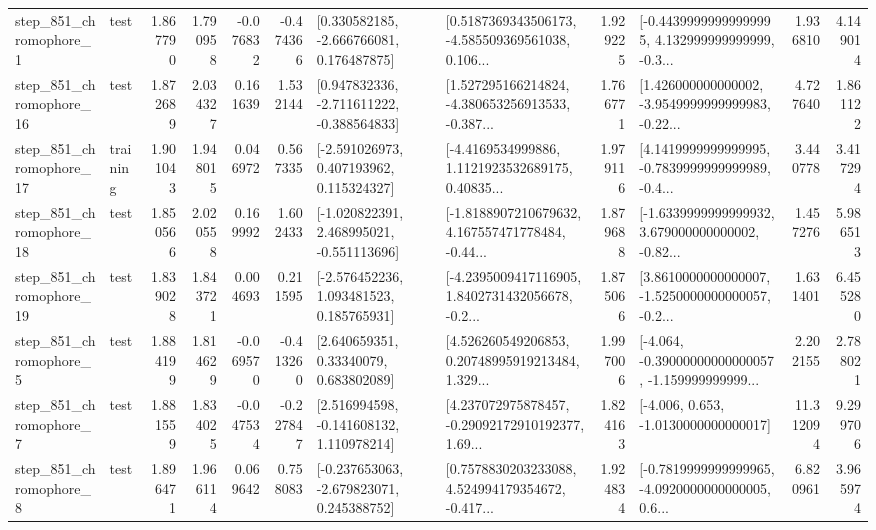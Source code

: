 \begin{tabular}{llrrrrllrlrr}
   step\_851\_chromophore\_1 &      test &      1.867790 &    1.790958 &     -0.076832 & -0.474366 &    [0.330582185, -2.666766081, 0.176487875] &  [0.5187369343506173, -4.585509369561038, 0.106... &       1.929225 &  [-0.44399999999999995, 4.132999999999999, -0.3... &            1.936810 &          4.149014 \\
  step\_851\_chromophore\_16 &      test &      1.872689 &    2.034327 &      0.161639 &  1.532144 &   [0.947832336, -2.711611222, -0.388564833] &  [1.527295166214824, -4.380653256913533, -0.387... &       1.766771 &  [1.426000000000002, -3.9549999999999983, -0.22... &            4.727640 &          1.861122 \\
  step\_851\_chromophore\_17 &  training &      1.901043 &    1.948015 &      0.046972 &  0.567335 &    [-2.591026973, 0.407193962, 0.115324327] &  [-4.4169534999886, 1.1121923532689175, 0.40835... &       1.979116 &  [4.1419999999999995, -0.7839999999999989, -0.4... &            3.440778 &          3.417294 \\
  step\_851\_chromophore\_18 &      test &      1.850566 &    2.020558 &      0.169992 &  1.602433 &   [-1.020822391, 2.468995021, -0.551113696] &  [-1.8188907210679632, 4.167557471778484, -0.44... &       1.879688 &  [-1.6339999999999932, 3.679000000000002, -0.82... &            1.457276 &          5.986513 \\
  step\_851\_chromophore\_19 &      test &      1.839028 &    1.843721 &      0.004693 &  0.211595 &    [-2.576452236, 1.093481523, 0.185765931] &  [-4.2395009417116905, 1.8402731432056678, -0.2... &       1.875066 &  [3.8610000000000007, -1.5250000000000057, -0.2... &            1.631401 &          6.455280 \\
   step\_851\_chromophore\_5 &      test &      1.884199 &    1.814629 &     -0.069570 & -0.413260 &      [2.640659351, 0.33340079, 0.683802089] &  [4.526260549206853, 0.20748995919213484, 1.329... &       1.997006 &  [-4.064, -0.39000000000000057, -1.159999999999... &            2.202155 &          2.788021 \\
   step\_851\_chromophore\_7 &      test &      1.881559 &    1.834025 &     -0.047534 & -0.227847 &    [2.516994598, -0.141608132, 1.110978214] &  [4.237072975878457, -0.29092172910192377, 1.69... &       1.824163 &               [-4.006, 0.653, -1.0130000000000017] &           11.312094 &          9.299706 \\
   step\_851\_chromophore\_8 &      test &      1.896471 &    1.966114 &      0.069642 &  0.758083 &   [-0.237653063, -2.679823071, 0.245388752] &  [0.7578830203233088, 4.524994179354672, -0.417... &       1.924834 &  [-0.7819999999999965, -4.0920000000000005, 0.6... &            6.820961 &          3.965974 \\

\end{tabular}
